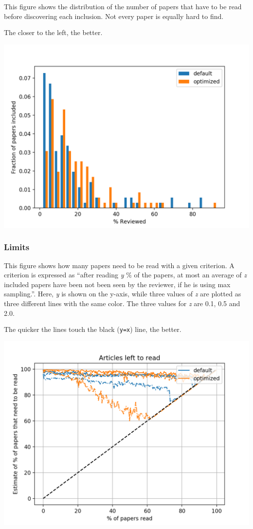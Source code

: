 \documentclass[
]{book}
\begin{document}
This figure shows the distribution of the number of papers that have to be read before discovering
each inclusion. Not every paper is equally hard to find.

The closer to the left, the better.

\includegraphics{figs/myfirstsim/Figure_2.png}

\pagebreak

\hypertarget{limits}{%
\subsubsection{Limits}\label{limits}}

This figure shows how many papers need to be read with a given criterion. A criterion is expressed
as ``after reading \emph{y} \% of the papers, at most an average of \emph{z} included papers have been not been
seen by the reviewer, if he is using max sampling.''. Here, \emph{y} is shown on the y-axis, while
three values of \emph{z} are plotted as three different lines with the same color. The three values for
\emph{z} are 0.1, 0.5 and 2.0.

The quicker the lines touch the black (\texttt{y=x}) line, the better.

\includegraphics{figs/myfirstsim/Figure_3.png}
\end{document}
